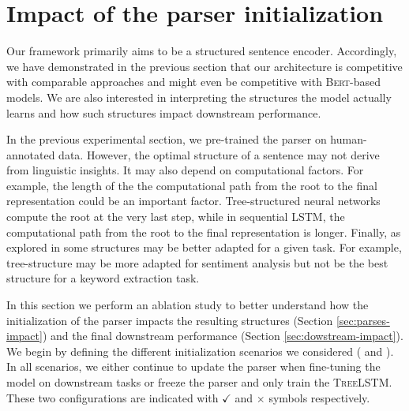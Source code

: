 


\section{Impact of the parser initialization}

Our framework primarily aims to be a structured sentence encoder. Accordingly, we have demonstrated in the previous section that our architecture is competitive with comparable approaches and might even be competitive with \textsc{Bert}-based models. We are also interested in interpreting the structures the model actually learns and how such structures impact downstream performance.

In the previous experimental section, we pre-trained the parser on human-annotated data. %
However, the optimal structure of a sentence may not derive from linguistic insights. It may also depend on computational factors. For example, the length of the the computational path from the root to the final representation could be an important factor. Tree-structured neural networks compute the root at the very last step, while in sequential \textsc{LSTM}, the computational path from the root to the final representation is longer. Finally, as explored in  some structures may be better adapted for a given task. For example, tree-structure may be more adapted for sentiment analysis but not be the best structure for a keyword extraction task.

In this section we perform an ablation study to better understand how the initialization of the parser impacts the resulting structures (Section \ref{sec:parses-impact}) and the final downstream performance (Section \ref{sec:dowstream-impact}). We begin by defining the different initialization scenarios we considered (
and ). In all scenarios, we either continue to update the parser when fine-tuning the model on downstream tasks or freeze the parser and only train the \textsc{TreeLSTM}. These two configurations are indicated with \textbf{$\checkmark$} and \textbf{$\times$} symbols respectively.
% 

